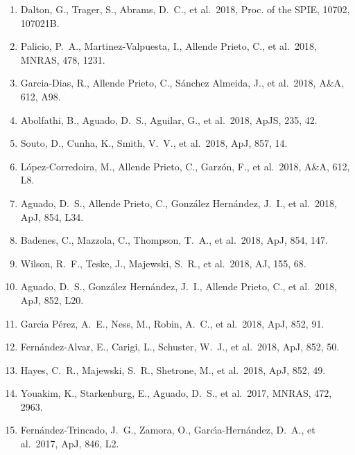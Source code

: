 \documentclass[12pt]{article}
\newcommand{\aj}{AJ}
\newcommand{\apj}{ApJ}
\newcommand{\apjs}{ApJS}
\newcommand{\apjl}{ApJ}
\newcommand{\mnras}{MNRAS}
\newcommand{\aap}{A\&A}
\newcommand{\procspie}{Proc. of the SPIE}
\begin{document}
\begin{enumerate}
\item Dalton, G., Trager, S., Abrams, D.~C., et al.\ 2018, \procspie, 10702, 107021B. %

\item Palicio, P.~A., Martinez-Valpuesta, I., Allende Prieto, C., et al.\ 2018, \mnras, 478, 1231. 

\item Garcia-Dias, R., Allende Prieto, C., S{\'a}nchez Almeida, J., et al.\ 2018, \aap, 612, A98. 

\item Abolfathi, B., Aguado, D.~S., Aguilar, G., et al.\ 2018, \apjs, 235, 42. 

\item Souto, D., Cunha, K., Smith, V.~V., et al.\ 2018, \apj, 857, 14. 

\item L{\'o}pez-Corredoira, M., Allende Prieto, C., Garz{\'o}n, F., et al.\ 2018, \aap, 612, L8. 

\item Aguado, D.~S., Allende Prieto, C., Gonz{\'a}lez Hern{\'a}ndez, J.~I., et al.\ 2018, \apjl, 854, L34. 

\item Badenes, C., Mazzola, C., Thompson, T.~A., et al.\ 2018, \apj, 854, 147. 

\item Wilson, R.~F., Teske, J., Majewski, S.~R., et al.\ 2018, \aj, 155, 68. 

\item Aguado, D.~S., Gonz{\'a}lez Hern{\'a}ndez, J.~I., Allende Prieto, C., et al.\ 2018, \apjl, 852, L20. 

\item Garc{\'\i}a P{\'e}rez, A.~E., Ness, M., Robin, A.~C., et al.\ 2018, \apj, 852, 91. 

\item Fern{\'a}ndez-Alvar, E., Carigi, L., Schuster, W.~J., et al.\ 2018, \apj, 852, 50. 

\item Hayes, C.~R., Majewski, S.~R., Shetrone, M., et al.\ 2018, \apj, 852, 49. 


\item Youakim, K., Starkenburg, E., Aguado, D.~S., et al.\ 2017, \mnras, 472, 2963. 

\item Fern{\'a}ndez-Trincado, J.~G., Zamora, O., Garc{\'\i}a-Hern{\'a}ndez, D.~A., et al.\ 2017, \apjl, 846, L2. 


\end{enumerate}
\end{document}
